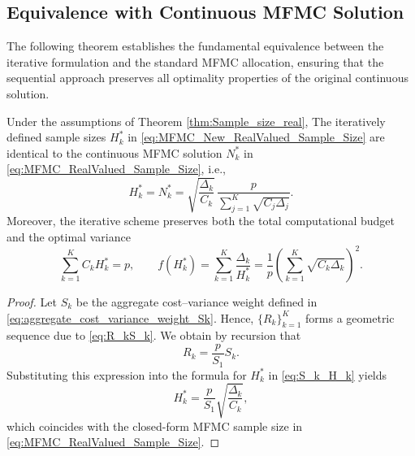 \subsection{Equivalence with Continuous MFMC Solution}

The following theorem establishes the fundamental equivalence between the iterative formulation and the standard MFMC allocation, ensuring that the sequential approach preserves all optimality properties of the original continuous solution.

%
\begin{theorem}\label{thm:MFMC_Iterative_RealValued_Sample_Size}
Under the assumptions of Theorem \ref{thm:Sample_size_real},
The iteratively defined sample sizes $H_k^*$ in \eqref{eq:MFMC_New_RealValued_Sample_Size} are identical to the continuous MFMC solution $N_k^*$ in \eqref{eq:MFMC_RealValued_Sample_Size}, i.e.,
\[
H_k^* = N_k^*
    = \sqrt{\frac{\Delta_k}{C_k}}\,
      \frac{p}{\sum_{j=1}^K \sqrt{C_j\Delta_j}}.
\]
Moreover, the iterative scheme preserves both the total computational budget and the optimal variance
\[
\sum_{k=1}^K C_k H_k^* = p, 
\qquad  
f(H_k^*) = \sum_{k=1}^K \frac{\Delta_k}{H_k^*} = \frac{1}{p} \left(\sum_{k=1}^K \sqrt{C_k\Delta_k}\right)^2.
\]
\end{theorem}
%


\begin{proof}

Let $S_k$ be the aggregate cost–variance weight defined in \eqref{eq:aggregate_cost_variance_weight_Sk}. 
%
Hence, $\{R_k\}_{k=1}^K$ forms a geometric sequence due to \eqref{eq:R_kS_k}. We obtain by recursion that
\[
    R_k = \frac{p}{S_1}S_k.
\]
Substituting this expression into the formula for $H_k^*$ in \eqref{eq:S_k_H_k} yields
\[
    H_k^*
    = \frac{p}{S_1}\sqrt{\frac{\Delta_k}{C_k}},
\]
which coincides with the closed-form MFMC sample size in \eqref{eq:MFMC_RealValued_Sample_Size}.  
\end{proof}


